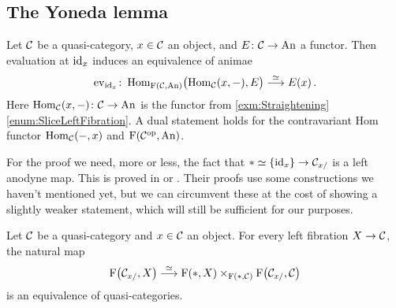 \subsection{The Yoneda lemma}\label{subsec:Yoneda}
\begin{thm}\label{thm:Yoneda}
	Let $\mathcal{C}$ be a quasi-category, $x\in \mathcal{C}$ an object, and $E\colon \mathcal{C}\rightarrow \mathrm{An}$ a functor. Then evaluation at $\operatorname{id}_x$ induces an equivalence of animae
	\begin{equation*}
		\operatorname{ev}_{\operatorname{id}_x}\colon \operatorname{Hom}_{\operatorname{F}(\mathcal{C},\mathrm{An})}\bigl(\operatorname{Hom}_{\mathcal{C}}(x,-),E\bigr)\overset{\simeq}{\longrightarrow} E(x)\,.
	\end{equation*}
	Here $\operatorname{Hom}_{\mathcal{C}}(x,-)\colon \mathcal{C}\rightarrow \mathrm{An}$ is the functor from \cref{exm:Straightening}\cref{enum:SliceLeftFibration}. A dual statement holds for the contravariant Hom functor $\operatorname{Hom}_{\mathcal{C}}(-,x)$ and $\operatorname{F}(\mathcal{C}^{\mathrm{op}},\mathrm{An})$.
\end{thm}
For the proof we need, more or less, the fact that $*\simeq \{\operatorname{id}_x\}\rightarrow \mathcal{C}_{x/}$ is a left anodyne map. This is proved in \cite[Lemma~4.1.4]{Land} or \cite[Corollary~D.7]{HigherCatsII}. Their proofs use some constructions we haven't mentioned yet, but we can circumvent these at the cost of showing a slightly weaker statement, which will still be sufficient for our purposes.
\begin{lem}\label{lem:WeaklyLeftAnodyne}
	Let $\mathcal{C}$ be a quasi-category and $x\in\mathcal{C}$ an object. For every left fibration $X\rightarrow \mathcal{C}$, the natural map
	\begin{equation*}
		\operatorname{F}\bigl(\mathcal{C}_{x/},X\bigr)\overset{\simeq}{\longrightarrow}\operatorname{F}(*,X)\times_{\operatorname{F}(*,\mathcal{C})}\operatorname{F}\bigl(\mathcal{C}_{x/},\mathcal{C}\bigr)
	\end{equation*}
	is an equivalence of quasi-categories.
\end{lem}
